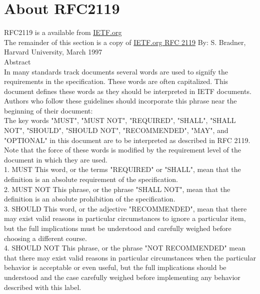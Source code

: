 \section{About RFC2119}
\label{sec:RFC2119}
\gls{RFC2119} is a available from \href{https://tools.ietf.org/html/rfc2119}{IETF.org}\\

The remainder of this section is a copy of \href{https://tools.ietf.org/html/rfc2119}{IETF.org RFC 2119}
By: S. Bradner, Harvard University, March 1997\\

Abstract\\

   In many standards track documents several words are used to signify
   the requirements in the specification.  These words are often
   capitalized.  This document defines these words as they should be
   interpreted in IETF documents.  Authors who follow these guidelines
   should incorporate this phrase near the beginning of their document:\\

      The key words "MUST", "MUST NOT", "REQUIRED", "SHALL", "SHALL
      NOT", "SHOULD", "SHOULD NOT", "RECOMMENDED",  "MAY", and
      "OPTIONAL" in this document are to be interpreted as described in
      RFC 2119.\\

   Note that the force of these words is modified by the requirement
   level of the document in which they are used.\\

1. MUST   This word, or the terms "REQUIRED" or "SHALL", mean that the
   definition is an absolute requirement of the specification.\\

2. MUST NOT   This phrase, or the phrase "SHALL NOT", mean that the
   definition is an absolute prohibition of the specification.\\

3. SHOULD   This word, or the adjective "RECOMMENDED", mean that there
   may exist valid reasons in particular circumstances to ignore a
   particular item, but the full implications must be understood and
   carefully weighed before choosing a different course.\\

4. SHOULD NOT   This phrase, or the phrase "NOT RECOMMENDED" mean that
   there may exist valid reasons in particular circumstances when the
   particular behavior is acceptable or even useful, but the full
   implications should be understood and the case carefully weighed
   before implementing any behavior described with this label.\\


